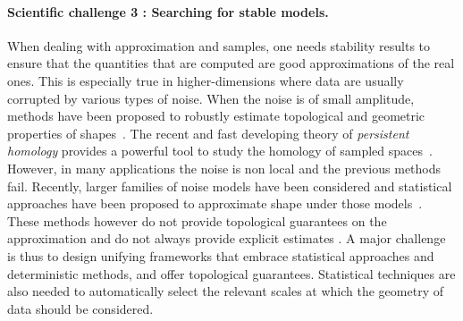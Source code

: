\paragraph{Scientific challenge 3 : Searching for stable models.} 
When dealing with approximation and samples, one needs stability results to ensure that the quantities that are computed are good approximations of the real ones. This is especially true in higher-dimensions where data are usually corrupted by various types of noise.  When the noise is of small amplitude, methods have been proposed to robustly estimate topological and geometric properties of shapes~\cite{geometrica-ccl09,nsw-tvu-2011}. 
 The recent and fast developing theory of {\em persistent homology} provides a powerful tool to study  the homology of sampled spaces~\cite{eh-ph-2008}.
However, in  many applications the noise is non local and the previous methods fail.
Recently,  larger families of noise models  have been considered and statistical approaches  have been proposed to approximate shape under  those models~\cite{gpvw-mme-2011}. These methods however do not provide topological guarantees on the approximation and do not always provide explicit estimates  . A major challenge is thus to design  unifying frameworks that embrace statistical approaches and deterministic methods, and offer topological guarantees.   Statistical techniques are also needed to automatically select the relevant scales at which the geometry of data should be considered. 


